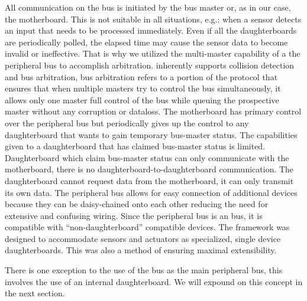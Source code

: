 	All communication on the \iic bus is initiated by the bus master or, as in our case, the motherboard. This is not suitable in all situations, e.g.: when a sensor detects an input that needs to be processed immediately. Even if all the daughterboards are periodically polled, the elapsed time may cause the sensor data to become invalid or ineffective. That is why we utilized the multi-master capability of a the \iic peripheral bus to accomplish arbitration. \iic inherently supports collision detection and bus arbitration, bus arbitration refers to a portion of the protocol that ensures that when multiple masters try to control the bus simultaneously, it allows only one master full control of the bus while queuing the prospective master without any corruption or dataloss\cite{nxpi2c}. The motherboard has primary control over the peripheral bus but periodically gives up the control to any daughterboard that wants to gain temporary bus-master status. The capabilities given to a daughterboard that has claimed bus-master status is limited. Daughterboard which claim bus-master status can only communicate with the motherboard, there is no daughterboard-to-daughterboard communication. The daughterboard cannot request data from the motherboard, it can only transmit its own data.
	The peripheral bus allows for easy connection of additional devices because they can be daisy-chained onto each other reducing the need for extensive and confusing wiring. Since the peripheral bus is an \iic bus, it is compatible with ``non-daughterboard'' \iic compatible devices. The framework was designed to accommodate sensors and actuators as specialized, single device daughterboards. This was also a method of ensuring maximal extensibility.
	
	There is one exception to the use of the \iic bus as the main peripheral bus, this involves the use of an internal daughterboard. We will expound on this concept in the next section.
	
